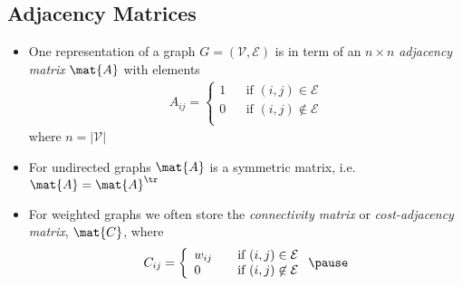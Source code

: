 \begin{slide}
\section[-1]{Adjacency Matrices}

\begin{PauseHighLight}
  \begin{itemize}
  \item One representation of a graph $G=(\mathcal{V},\mathcal{E})$ is
    in term of an $n\times n$ \emph{adjacency matrix} $\mat{A}$ with elements
    \begin{align*}
      A_{ij} = \left\{
          \begin{array}{lll}
            1 & & \mbox{if $(i,j)\in\mathcal{E}$}\\
            0 & & \mbox{if $(i,j)\not\in\mathcal{E}$}\\
          \end{array}\right.
    \end{align*}
    where $n=\vert\mathcal{V}\vert$\pause
  \item For undirected graphs $\mat{A}$ is a symmetric matrix, i.e.
    $\mat{A}=\mat{A}^\tr$\pause
  \item For weighted graphs we often store the \emph{connectivity
      matrix} or \emph{cost-adjacency matrix}, $\mat{C}$, where
    \begin{align*}
      C_{ij} = \left\{
          \begin{array}{lll}
            w_{ij} & & \mbox{if $(i,j)\in\mathcal{E}$}\\
            0 & & \mbox{if $(i,j)\not\in\mathcal{E}$}\\
          \end{array}\right.\pause
    \end{align*}
  \end{itemize}
\end{PauseHighLight}

\end{slide}


